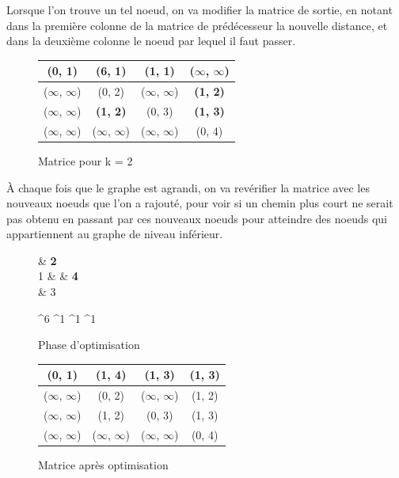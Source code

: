 \documentclass[a4paper,12pt,final] {article}
\begin{document}
Lorsque l'on trouve un tel noeud, on va modifier la matrice de sortie, en notant dans la première colonne de la matrice de prédécesseur la nouvelle distance, et dans la deuxième colonne le noeud par lequel il faut passer.\\

\begin{figure}[htpd]
\begin{center}
\begin{tabular}{|c|c|c|c|}
\hline
(0, 1) & (6, 1) & (1, 1) & ($\infty$, $\infty$) \\
\hline
($\infty$, $\infty$) & (0, 2) & ($\infty$, $\infty$) & {\color{red} \bf (1, 2)} \\
\hline
($\infty$, $\infty$) & {\color{red} \bf (1, 2)} & (0, 3) & {\color{red} \bf (1, 3)}\\
\hline
($\infty$, $\infty$) & ($\infty$, $\infty$) & ($\infty$, $\infty$) & (0, 4) \\
\hline
\end{tabular}
\end{center}
\caption{Matrice pour k = 2}
\end{figure}

À chaque fois que le graphe est agrandi, on va revérifier la matrice avec les nouveaux noeuds que l'on a rajouté, pour voir si un chemin plus court ne serait pas obtenu en passant par ces nouveaux noeuds pour atteindre des noeuds qui appartiennent au graphe de niveau inférieur.\\

\begin{figure}[h!]
 \centering
 \begin{psmatrix}[mnode=circle]
	    & {\color{red} \bf 2}\\
	 1 &    & {\color{red} \bf 4}\\
	    & 3\\
\end{psmatrix}
	
	^{6}
	^{1}
	^{1}
	^{1}

  \caption{Phase d'optimisation}
\end{figure}

\begin{figure}[h!]
\begin{center}
\begin{tabular}{|c|c|c|c|}
\hline
(0, 1) & {\color{red} \bf (1, 4)} & (1, 3) & {\color{red} \bf (1, 3)} \\
\hline
($\infty$, $\infty$) & (0, 2) & ($\infty$, $\infty$) & (1, 2) \\
\hline
($\infty$, $\infty$) & (1, 2) & (0, 3) & (1, 3)\\
\hline
($\infty$, $\infty$) & ($\infty$, $\infty$) & ($\infty$, $\infty$) & (0, 4) \\
\hline
\end{tabular}
\end{center}
\caption{Matrice après optimisation}
\end{figure}
\end{document}
